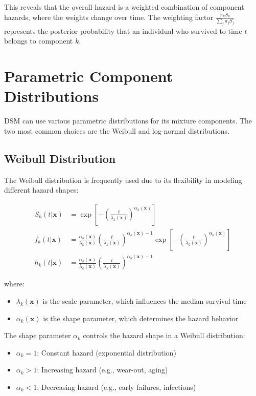 This reveals that the overall hazard is a weighted combination of component hazards, where the weights change over time. The weighting factor $\frac{\pi_k S_k}{\sum_j \pi_j S_j}$ represents the posterior probability that an individual who survived to time $t$ belongs to component $k$.

\section{Parametric Component Distributions}

DSM can use various parametric distributions for its mixture components. The two most common choices are the Weibull and log-normal distributions.

\subsection{Weibull Distribution}

The Weibull distribution is frequently used due to its flexibility in modeling different hazard shapes:

\begin{equationbox}[title=Weibull Distribution Functions]
\begin{align}
    S_k(t|\mathbf{x}) &= \exp\left[-\left(\frac{t}{\lambda_k(\mathbf{x})}\right)^{\alpha_k(\mathbf{x})}\right] \\
    f_k(t|\mathbf{x}) &= \frac{\alpha_k(\mathbf{x})}{\lambda_k(\mathbf{x})}\left(\frac{t}{\lambda_k(\mathbf{x})}\right)^{\alpha_k(\mathbf{x})-1}\exp\left[-\left(\frac{t}{\lambda_k(\mathbf{x})}\right)^{\alpha_k(\mathbf{x})}\right] \\
    h_k(t|\mathbf{x}) &= \frac{\alpha_k(\mathbf{x})}{\lambda_k(\mathbf{x})}\left(\frac{t}{\lambda_k(\mathbf{x})}\right)^{\alpha_k(\mathbf{x})-1}
\end{align}

where:
\begin{itemize}
    \item $\lambda_k(\mathbf{x})$ is the scale parameter, which influences the median survival time
    \item $\alpha_k(\mathbf{x})$ is the shape parameter, which determines the hazard behavior
\end{itemize}
\end{equationbox}

The shape parameter $\alpha_k$ controls the hazard shape in a Weibull distribution:
\begin{itemize}
    \item $\alpha_k = 1$: Constant hazard (exponential distribution)
    \item $\alpha_k > 1$: Increasing hazard (e.g., wear-out, aging)
    \item $\alpha_k < 1$: Decreasing hazard (e.g., early failures, infections)
\end{itemize}

